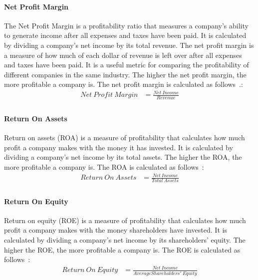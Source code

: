 \documentclass[../xlapes02]{subfiles}
\begin{document}
    \paragraph{Net Profit Margin}\label{par:net-profit-margin}
    The Net Profit Margin is a profitability ratio that measures a company's ability to generate income after all expenses and taxes have been paid. It is calculated by dividing a company's net income by its total revenue. The net profit margin is a measure of how much of each dollar of revenue is left over after all expenses and taxes have been paid. It is a useful metric for comparing the profitability of different companies in the same industry. The higher the net profit margin, the more profitable a company is. The net profit margin is calculated as follows~\cite{investopedia-net-profit-margin}.:
    \begin{equation}
        \begin{split}
            Net\ Profit\ Margin&=\frac{Net\ Income}{Revenue}\\
        \end{split}
    \end{equation}

    \paragraph{Return On Assets}\label{par:return-on-assets}
    Return on assets (ROA) is a measure of profitability that calculates how much profit a company makes with the money it has invested. It is calculated by dividing a company's net income by its total assets. The higher the ROA, the more profitable a company is. The ROA is calculated as follows~\cite{investopedia-return-on-assets}:
    \begin{equation}
        \begin{split}
            Return\ On\ Assets&=\frac{Net\ Income}{Total\ Assets}\\
        \end{split}
    \end{equation}

    \paragraph{Return On Equity}\label{par:return-on-equity}
    Return on equity (ROE) is a measure of profitability that calculates how much profit a company makes with the money shareholders have invested. It is calculated by dividing a company's net income by its shareholders' equity. The higher the ROE, the more profitable a company is. The ROE is calculated as follows~\cite{investopedia-return-on-equity}:
    \begin{equation}
        \begin{split}
            Return\ On\ Equity&=\frac{Net\ Income}{Average Shareholders'\ Equity}\\
        \end{split}
    \end{equation}
\end{document}
